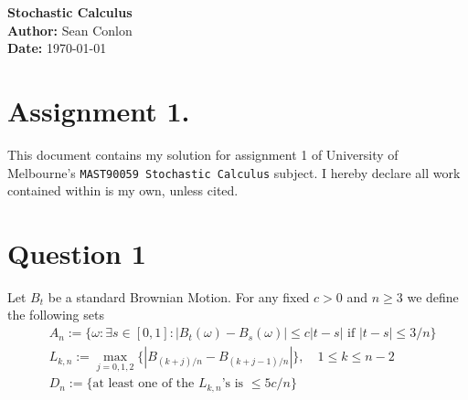 \documentclass{article}
\begin{document}
\begin{titlepage}
    \centering
    {\Huge \textbf{Stochastic Calculus}}\\[1.5cm] %
    \textbf{Author:} Sean Conlon\\[1cm] %
    \textbf{Date:} \today\\[3cm] %
    
    \section*{Assignment 1.}
    This document contains my solution for assignment 1 of University of Melbourne's \texttt{MAST90059 Stochastic Calculus} subject. I hereby declare all work contained within is my own, unless cited. 

    \tableofcontents
    
\end{titlepage}

\newpage
\section{Question 1}

\begin{tcolorbox}
[colframe=black,colback=gray!5,boxrule=0.5pt]
Let $B_t$ be a standard Brownian Motion. For any fixed $c > 0$ and $n\geq 3$ we define the following sets
\begin{align*}
    & A_n := \{\omega : \exists s\in[0,1] :|B_t(\omega) - B_s(\omega)|\leq c|t-s| \text{ if } |t-s|\leq 3/n\} \\
    & L_{k,n} := \max_{j=0,1,2} \{|B_{(k+j)/n} - B_{(k+j-1)/n}|\}, \quad 1\leq k\leq n-2 \\
    & D_n  := \{\text{at least one of the $L_{k,n}$'s is }\leq 5c/n\}
\end{align*}
\end{tcolorbox}
\end{document}
